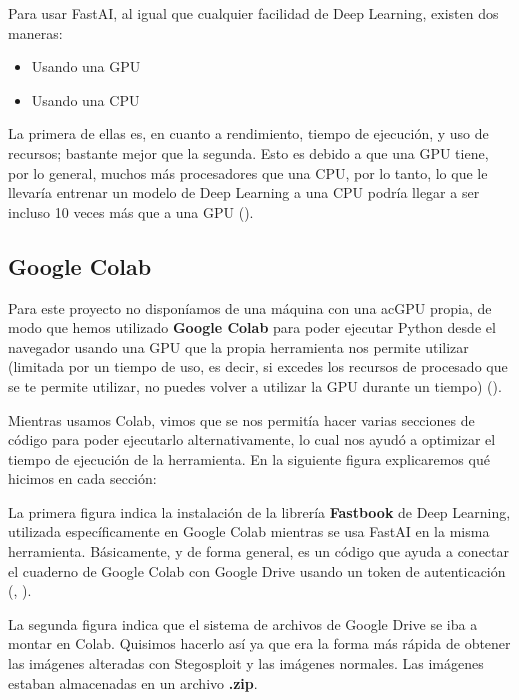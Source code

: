 Para usar FastAI, al igual que cualquier facilidad de Deep Learning, existen dos maneras:

\begin{itemize}
\item Usando una \ac{GPU}
\item Usando una \ac{CPU}
\end{itemize}

La primera de ellas es, en cuanto a rendimiento, tiempo de ejecución, y uso de recursos; bastante mejor que la segunda. Esto es debido a que una \ac{GPU} tiene, por lo general, muchos más procesadores que una \ac{CPU}, por lo tanto, lo que le llevaría entrenar un modelo de Deep Learning a una \ac{CPU} podría llegar a ser incluso 10 veces más que a una \ac{GPU} (\cite{gpu-cpu}). %

\subsection{Google Colab}

Para este proyecto no disponíamos de una máquina con una ac{GPU} propia, de modo que hemos utilizado \textbf{Google Colab} para poder ejecutar Python desde el navegador usando una \ac{GPU} que la propia herramienta nos permite utilizar (limitada por un tiempo de uso, es decir, si excedes los recursos de procesado que se te permite utilizar, no puedes volver a utilizar la \ac{GPU} durante un tiempo) (\cite{google-colab}). %

Mientras usamos Colab, vimos que se nos permitía hacer varias secciones de código para poder ejecutarlo alternativamente, lo cual nos ayudó a optimizar el tiempo de ejecución de la herramienta. En la siguiente figura explicaremos qué hicimos en cada sección:


La primera figura indica la instalación de la librería \textbf{Fastbook} de Deep Learning, utilizada específicamente en Google Colab mientras se usa FastAI en la misma herramienta. Básicamente, y de forma general, es un código que ayuda a conectar el cuaderno de Google Colab con Google Drive usando un token de autenticación (\cite{fastbook-1}, \cite{fastbook-2}). %


La segunda figura indica que el sistema de archivos de Google Drive se iba a montar en Colab. Quisimos hacerlo así ya que era la forma más rápida de obtener las imágenes alteradas con Stegosploit y las imágenes normales. Las imágenes estaban almacenadas en un archivo \textbf{.zip}.

